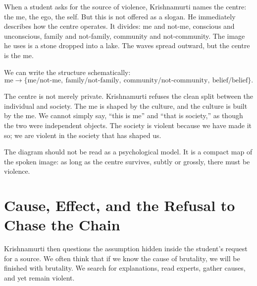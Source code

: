 When a student asks for the source of violence, Krishnamurti names the centre: the me, the ego, the self. But this is not offered as a slogan. He immediately describes how the centre operates. It divides: me and not-me, conscious and unconscious, family and not-family, community and not-community. The image he uses is a stone dropped into a lake. The waves spread outward, but the centre is the me.

We can write the structure schematically:
\begin{equation}
\text{me}
\rightarrow
\{\text{me/not-me},\ \text{family/not-family},\ \text{community/not-community},\ \text{belief/belief}\}.
\end{equation}

The centre is not merely private. Krishnamurti refuses the clean split between the individual and society. The me is shaped by the culture, and the culture is built by the me. We cannot simply say, ``this is me'' and ``that is society,'' as though the two were independent objects. The society is violent because we have made it so; we are violent in the society that has shaped us.

\begin{figure}
\centering
{}
\end{figure}

The diagram should not be read as a psychological model. It is a compact map of the spoken image: as long as the centre survives, subtly or grossly, there must be violence.

\section{Cause, Effect, and the Refusal to Chase the Chain}

Krishnamurti then questions the assumption hidden inside the student's request for a source. We often think that if we know the cause of brutality, we will be finished with brutality. We search for explanations, read experts, gather causes, and yet remain violent.

